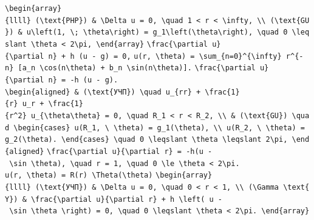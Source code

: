 \documentclass[
  ukrainian,
]{article}
\begin{document}
\texttt{\textbackslash{}begin\{array\}\{llll\}\ (\textbackslash{}text\{PHP\})\ \&\ \textbackslash{}Delta\ u\ =\ 0,\ \textbackslash{}quad\ 1\ \textless{}\ r\ \textless{}\ \textbackslash{}infty,\ \textbackslash{}\textbackslash{}\ (\textbackslash{}text\{GU\})\ \&\ u\textbackslash{}left(1,\ \textbackslash{};\ \textbackslash{}theta\textbackslash{}right)\ =\ g\_1\textbackslash{}left(\textbackslash{}theta\textbackslash{}right),\ \textbackslash{}quad\ 0\ \textbackslash{}leqslant\ \textbackslash{}theta\ \textless{}\ 2\textbackslash{}pi,\ \textbackslash{}end\{array\}}
\texttt{\textbackslash{}frac\{\textbackslash{}partial\ u\}\{\textbackslash{}partial\ n\}\ +\ h\ (u\ -\ g)\ =\ 0,}
\texttt{u(r,\ \textbackslash{}theta)\ =\ \textbackslash{}sum\_\{n=0\}\^{}\{\textbackslash{}infty\}\ r\^{}\{-n\}\ {[}a\_n\ \textbackslash{}cos(n\textbackslash{}theta)\ +\ b\_n\ \textbackslash{}sin(n\textbackslash{}theta){]}.}
\texttt{\textbackslash{}frac\{\textbackslash{}partial\ u\}\{\textbackslash{}partial\ n\}\ =\ -h\ (u\ -\ g).}
\texttt{\textbackslash{}begin\{aligned\}\ \&\ (\textbackslash{}text\{УЧП\})\ \textbackslash{}quad\ u\_\{rr\}\ +\ \textbackslash{}frac\{1\}\{r\}\ u\_r\ +\ \textbackslash{}frac\{1\}\{r\^{}2\}\ u\_\{\textbackslash{}theta\textbackslash{}theta\}\ =\ 0,\ \textbackslash{}quad\ R\_1\ \textless{}\ r\ \textless{}\ R\_2,\ \textbackslash{}\textbackslash{}\ \&\ (\textbackslash{}text\{GU\})\ \textbackslash{}quad\ \textbackslash{}begin\{cases\}\ u(R\_1,\ \textbackslash{}\ \textbackslash{}theta)\ =\ g\_1(\textbackslash{}theta),\ \textbackslash{}\textbackslash{}\ u(R\_2,\ \textbackslash{}\ \textbackslash{}theta)\ =\ g\_2(\textbackslash{}theta).\ \textbackslash{}end\{cases\}\ \textbackslash{}quad\ 0\ \textbackslash{}leqslant\ \textbackslash{}theta\ \textbackslash{}leqslant\ 2\textbackslash{}pi,\ \textbackslash{}end\{aligned\}}
\texttt{\textbackslash{}frac\{\textbackslash{}partial\ u\}\{\textbackslash{}partial\ r\}\ =\ -h(u\ -\ \textbackslash{}sin\ \textbackslash{}theta),\ \textbackslash{}quad\ r\ =\ 1,\ \textbackslash{}quad\ 0\ \textbackslash{}le\ \textbackslash{}theta\ \textless{}\ 2\textbackslash{}pi.}
\texttt{u(r,\ \textbackslash{}theta)\ =\ R(r)\ \textbackslash{}Theta(\textbackslash{}theta)}
\texttt{\textbackslash{}begin\{array\}\{llll\}\ (\textbackslash{}text\{УЧП\})\ \&\ \textbackslash{}Delta\ u\ =\ 0,\ \textbackslash{}quad\ 0\ \textless{}\ r\ \textless{}\ 1,\ \textbackslash{}\textbackslash{}\ (\textbackslash{}Gamma\ \textbackslash{}text\{Y\})\ \&\ \textbackslash{}frac\{\textbackslash{}partial\ u\}\{\textbackslash{}partial\ r\}\ +\ h\ \textbackslash{}left(\ u\ -\ \textbackslash{}sin\ \textbackslash{}theta\ \textbackslash{}right)\ =\ 0,\ \textbackslash{}quad\ 0\ \textbackslash{}leqslant\ \textbackslash{}theta\ \textless{}\ 2\textbackslash{}pi.\ \textbackslash{}end\{array\}}
\end{document}
